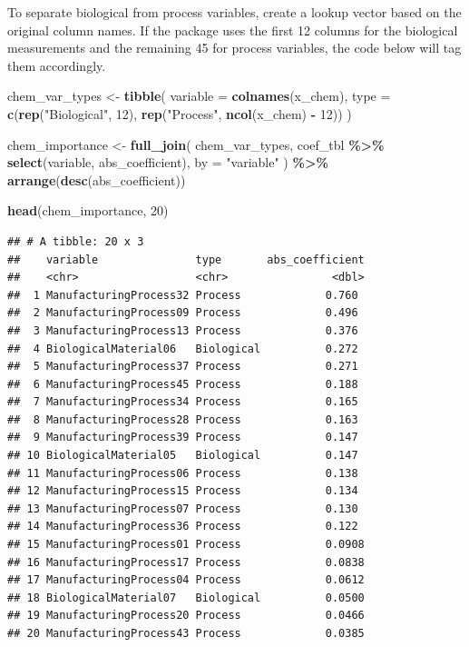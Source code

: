 \documentclass[
  11pt,
]{article}
\newenvironment{Shaded}{\begin{snugshade}}{\end{snugshade}}
\newcommand{\AttributeTok}[1]{\textcolor[rgb]{0.13,0.29,0.53}{#1}}
\newcommand{\DecValTok}[1]{\textcolor[rgb]{0.00,0.00,0.81}{#1}}
\newcommand{\FunctionTok}[1]{\textcolor[rgb]{0.13,0.29,0.53}{\textbf{#1}}}
\newcommand{\NormalTok}[1]{#1}
\newcommand{\OtherTok}[1]{\textcolor[rgb]{0.56,0.35,0.01}{#1}}
\newcommand{\SpecialCharTok}[1]{\textcolor[rgb]{0.81,0.36,0.00}{\textbf{#1}}}
\newcommand{\StringTok}[1]{\textcolor[rgb]{0.31,0.60,0.02}{#1}}
\begin{document}
To separate biological from process variables, create a lookup vector
based on the original column names. If the package uses the first 12
columns for the biological measurements and the remaining 45 for process
variables, the code below will tag them accordingly.

\begin{Shaded}
\begin{Highlighting}[]
\NormalTok{chem\_var\_types }\OtherTok{\textless{}{-}} \FunctionTok{tibble}\NormalTok{(}
  \AttributeTok{variable =} \FunctionTok{colnames}\NormalTok{(x\_chem),}
  \AttributeTok{type =} \FunctionTok{c}\NormalTok{(}\FunctionTok{rep}\NormalTok{(}\StringTok{"Biological"}\NormalTok{, }\DecValTok{12}\NormalTok{), }\FunctionTok{rep}\NormalTok{(}\StringTok{"Process"}\NormalTok{, }\FunctionTok{ncol}\NormalTok{(x\_chem) }\SpecialCharTok{{-}} \DecValTok{12}\NormalTok{))}
\NormalTok{)}

\NormalTok{chem\_importance }\OtherTok{\textless{}{-}} \FunctionTok{full\_join}\NormalTok{(}
\NormalTok{  chem\_var\_types,}
\NormalTok{  coef\_tbl }\SpecialCharTok{\%\textgreater{}\%} \FunctionTok{select}\NormalTok{(variable, abs\_coefficient),}
  \AttributeTok{by =} \StringTok{"variable"}
\NormalTok{) }\SpecialCharTok{\%\textgreater{}\%} \FunctionTok{arrange}\NormalTok{(}\FunctionTok{desc}\NormalTok{(abs\_coefficient))}

\FunctionTok{head}\NormalTok{(chem\_importance, }\DecValTok{20}\NormalTok{)}
\end{Highlighting}
\end{Shaded}

\begin{verbatim}
## # A tibble: 20 x 3
##    variable               type       abs_coefficient
##    <chr>                  <chr>                <dbl>
##  1 ManufacturingProcess32 Process             0.760 
##  2 ManufacturingProcess09 Process             0.496 
##  3 ManufacturingProcess13 Process             0.376 
##  4 BiologicalMaterial06   Biological          0.272 
##  5 ManufacturingProcess37 Process             0.271 
##  6 ManufacturingProcess45 Process             0.188 
##  7 ManufacturingProcess34 Process             0.165 
##  8 ManufacturingProcess28 Process             0.163 
##  9 ManufacturingProcess39 Process             0.147 
## 10 BiologicalMaterial05   Biological          0.147 
## 11 ManufacturingProcess06 Process             0.138 
## 12 ManufacturingProcess15 Process             0.134 
## 13 ManufacturingProcess07 Process             0.130 
## 14 ManufacturingProcess36 Process             0.122 
## 15 ManufacturingProcess01 Process             0.0908
## 16 ManufacturingProcess17 Process             0.0838
## 17 ManufacturingProcess04 Process             0.0612
## 18 BiologicalMaterial07   Biological          0.0500
## 19 ManufacturingProcess20 Process             0.0466
## 20 ManufacturingProcess43 Process             0.0385
\end{verbatim}
\end{document}
